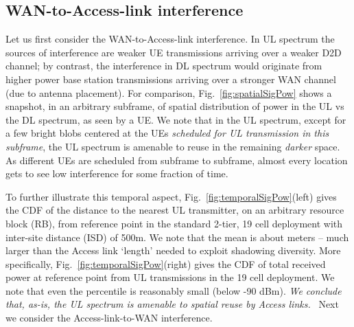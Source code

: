 \documentclass[journal]{IEEEtran}
\begin{document}
\subsection{WAN-to-Access-link interference}
\label{subsec:wan2accIM}
Let us first consider the WAN-to-Access-link interference.  In UL spectrum the sources of interference are weaker UE transmissions arriving over a weaker D2D channel; by contrast, the interference in DL spectrum would originate from higher power base station transmissions arriving over a stronger WAN channel (due to antenna placement).  For comparison, Fig.~\ref{fig:spatialSigPow} shows a snapshot, in an arbitrary subframe, of spatial distribution of power in the UL vs the DL spectrum, as seen by a UE.   We note that in the UL spectrum, except for a few bright blobs centered at the UEs {\em scheduled for UL transmission in this subframe}, the UL spectrum is amenable to reuse in the remaining {\em darker} space.  As different UEs are scheduled from subframe to subframe, almost every location gets to see low interference for some fraction of time.

 \begin{figure*}[!]
\centering
{}
\caption{Snapshot of total signal power (left) in UL spectrum; -90dBm contour curve is plotted in white for reference.  One UE per sector is scheduled and allocated the entire 10MHz bandwidth. (Right) That in  DL spectrum.}
\label{fig:spatialSigPow}
\end{figure*}
\begin{figure*}
\centering
{}
\caption{(Left) CDF of distance to the nearest UL transmitter on a given RB from point . (Right) CDF of total received power in UL spectrum at point ; note \%-tile is reasonably small (below -90 dBm).}
\label{fig:temporalSigPow}
\end{figure*}

To further illustrate this temporal aspect, Fig.~\ref{fig:temporalSigPow}(left) gives the CDF of the distance to the nearest UL transmitter, on an arbitrary resource block (RB), from reference point  in the standard 2-tier, 19 cell deployment with inter-site distance (ISD) of 500m.  We note that the mean is about  meters -- much larger than the Access link `length' needed to exploit shadowing diversity.   More specifically, Fig.~\ref{fig:temporalSigPow}(right) gives the CDF of total received power at reference point  from UL transmissions in the 19 cell deployment.  We note that even the  percentile is reasonably small (below -90 dBm). {\em We conclude that, as-is, the UL spectrum is amenable to spatial reuse by Access links.}\footnotemark~ Next we consider the Access-link-to-WAN interference.
\end{document}
